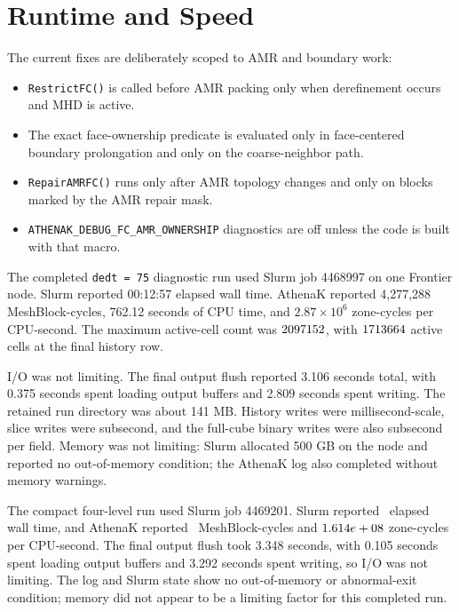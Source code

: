 \documentclass[11pt]{article}
\newcommand{\code}[1]{\texttt{#1}}
\begin{document}
\section{Runtime and Speed}

The current fixes are deliberately scoped to AMR and boundary work:
\begin{itemize}
  \item \code{RestrictFC()} is called before AMR packing only when derefinement
    occurs and MHD is active.
  \item The exact face-ownership predicate is evaluated only in face-centered
    boundary prolongation and only on the coarse-neighbor path.
  \item \code{RepairAMRFC()} runs only after AMR topology changes and only on
    blocks marked by the AMR repair mask.
  \item \code{ATHENAK\_DEBUG\_FC\_AMR\_OWNERSHIP} diagnostics are off unless the
    code is built with that macro.
\end{itemize}

The completed \code{dedt = 75} diagnostic run used Slurm job 4468997 on one
Frontier node.  Slurm reported 00:12:57 elapsed wall time.  AthenaK reported
4,277,288 MeshBlock-cycles, 762.12 seconds of CPU time, and
\(2.87\times10^6\) zone-cycles per CPU-second.  The maximum active-cell count
was \(2097152\), with \(1713664\) active cells at the final
history row.

I/O was not limiting.  The final output flush reported 3.106 seconds total,
with 0.375 seconds spent loading output buffers and 2.809 seconds spent writing.
The retained run directory was about 141 MB.  History writes were millisecond-scale,
slice writes were subsecond, and the full-cube binary writes were also subsecond
per field.  Memory was not limiting: Slurm allocated 500 GB on the node and
reported no out-of-memory condition; the AthenaK log also completed without
memory warnings.

The compact four-level run used Slurm job 4469201.  Slurm reported
\CompactWallTime\ elapsed wall time, and AthenaK reported
\CompactMeshblockCycles\ MeshBlock-cycles and
\(1.614e+08\) zone-cycles per CPU-second.  The final output
flush took 3.348 seconds, with 0.105 seconds spent loading output buffers and
3.292 seconds spent writing, so I/O was not limiting.  The log and Slurm state
show no out-of-memory or abnormal-exit condition; memory did not appear to be a
limiting factor for this completed run.
\end{document}
